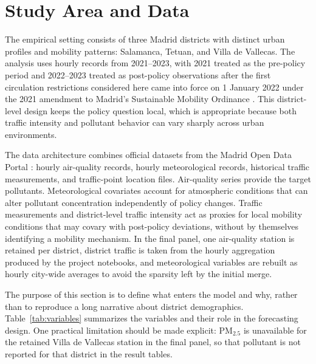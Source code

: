 \section{Study Area and Data}\label{sec:data}

The empirical setting consists of three Madrid districts with distinct urban profiles and mobility patterns: Salamanca, Tetuan, and Villa de Vallecas. The analysis uses hourly records from 2021--2023, with 2021 treated as the pre-policy period and 2022--2023 treated as post-policy observations after the first circulation restrictions considered here came into force on 1 January 2022 under the 2021 amendment to Madrid's Sustainable Mobility Ordinance \cite{OrdenanzaMovilidadMadrid2021}. This district-level design keeps the policy question local, which is appropriate because both traffic intensity and pollutant behavior can vary sharply across urban environments.

The data architecture combines official datasets from the Madrid Open Data Portal \cite{MadridOpenDataPortal}: hourly air-quality records, hourly meteorological records, historical traffic measurements, and traffic-point location files. Air-quality series provide the target pollutants. Meteorological covariates account for atmospheric conditions that can alter pollutant concentration independently of policy changes. Traffic measurements and district-level traffic intensity act as proxies for local mobility conditions that may covary with post-policy deviations, without by themselves identifying a mobility mechanism. In the final panel, one air-quality station is retained per district, district traffic is taken from the hourly aggregation produced by the project notebooks, and meteorological variables are rebuilt as hourly city-wide averages to avoid the sparsity left by the initial merge.

The purpose of this section is to define what enters the model and why, rather than to reproduce a long narrative about district demographics. Table~\ref{tab:variables} summarizes the variables and their role in the forecasting design. One practical limitation should be made explicit: PM$_{2.5}$ is unavailable for the retained Villa de Vallecas station in the final panel, so that pollutant is not reported for that district in the result tables.

